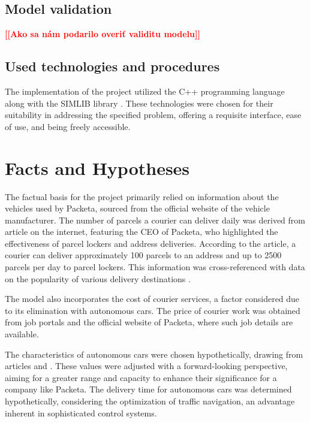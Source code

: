 \documentclass[a4paper, 11pt, a4paper]{article}
\newcommand{\todo}[1]{\textcolor{red}{\textbf{[[#1]]}}}
\begin{document}
\subsection{Model validation}

\noindent\todo{Ako sa nám podarilo overiť validitu modelu}


\subsection{Used technologies and procedures}

The implementation of the project utilized the C++ programming language along with the SIMLIB library \cite{SIMLIB}.
These technologies were chosen for their suitability in addressing the specified problem, offering a requisite interface,
ease of use, and being freely accessible.


\section{Facts and Hypotheses}

The factual basis for the project primarily relied on information about the vehicles used by Packeta, sourced from the official
website of the vehicle manufacturer. The number of parcels a courier can deliver daily was derived from article \cite{parcels.num} on the internet,
featuring the CEO of Packeta, who highlighted the effectiveness of parcel lockers and address deliveries. According to the article,
a courier can deliver approximately 100 parcels to an address and up to 2500 parcels per day to parcel lockers. This information was
cross-referenced with data on the popularity of various delivery destinations \cite{delivery.percentage}.

The model also incorporates the cost of courier services, a factor considered due to its elimination with autonomous cars.
The price of courier work was obtained from job portals and the official website of Packeta, where such job details are available.

The characteristics of autonomous cars were chosen hypothetically, drawing from articles \cite{autonomous.emissions} and \cite{autonomous.models}. These values were adjusted with a
forward-looking perspective, aiming for a greater range and capacity to enhance their significance for a company like Packeta. The delivery
time for autonomous cars was determined hypothetically, considering the optimization of traffic navigation, an advantage inherent in sophisticated
control systems.
\end{document}
